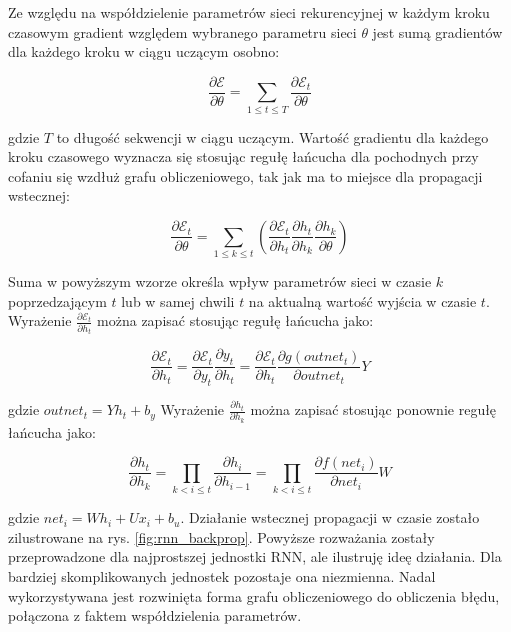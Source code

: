 \documentclass[oneside, mag]{mgr}
\begin{document}
Ze względu na współdzielenie parametrów sieci rekurencyjnej w każdym kroku czasowym gradient względem wybranego parametru sieci $\theta$ jest sumą gradientów dla każdego kroku w ciągu uczącym osobno:

\begin{equation}
	\frac{\partial \mathcal{E}}{\partial \theta} = \sum_{1 \leq t \leq T} \frac{\partial \mathcal{E}_t}{\partial \theta}
\end{equation}

gdzie $T$ to długość sekwencji w ciągu uczącym. Wartość gradientu dla każdego kroku czasowego wyznacza się stosując regułę łańcucha dla pochodnych przy cofaniu się wzdłuż grafu obliczeniowego, tak jak ma to miejsce dla propagacji wstecznej:

\begin{equation}
	\frac{\partial \mathcal{E}_t}{\partial \theta} = \sum_{1 \leq k \leq t} (\frac{\partial \mathcal{E}_t}{\partial h_t} \frac{\partial h_t}{\partial h_k} \frac{\partial h_k}{\partial \theta})
\end{equation}

Suma w powyższym wzorze określa wpływ parametrów sieci w czasie $k$ poprzedzającym $t$ lub w samej chwili $t$ na aktualną wartość wyjścia w czasie $t$. Wyrażenie $\frac{\partial \mathcal{E}_t}{\partial h_t}$ można zapisać stosując regułę łańcucha jako:

\begin{equation}
	\frac{\partial \mathcal{E}_t}{\partial h_t} = \frac{\partial \mathcal{E}_t}{\partial y_t} \frac{\partial y_t}{\partial h_t} = \frac{\partial \mathcal{E}_t}{\partial h_t} \frac{\partial g(outnet_t)}{\partial outnet_t} Y
\end{equation}

gdzie $outnet_t = Y h_t + b_y$ Wyrażenie $\frac{\partial h_t}{\partial h_k}$ można zapisać stosując ponownie regułę łańcucha jako:

\begin{equation}
	\frac{\partial h_t}{\partial h_k} = \prod_{k < i \leq t} \frac{\partial h_i}{\partial h_{i-1}} = \prod_{k < i \leq t} \frac{\partial f(net_i)}{\partial net_i} W
\end{equation}

gdzie $net_i = W h_i + U x_i + b_u$. Działanie wstecznej propagacji w czasie zostało zilustrowane na rys. \ref{fig:rnn_backprop}. Powyższe rozważania zostały przeprowadzone dla najprostszej jednostki RNN, ale ilustruję ideę działania. Dla bardziej skomplikowanych jednostek pozostaje ona niezmienna. Nadal wykorzystywana jest rozwinięta forma grafu obliczeniowego do obliczenia błędu, połączona z faktem współdzielenia parametrów. 
\end{document}
